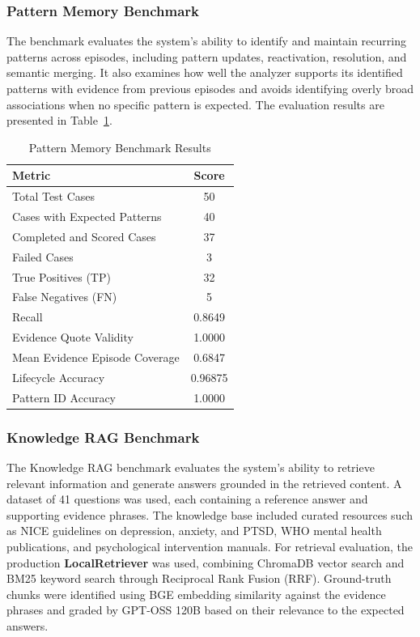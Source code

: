 \documentclass[conference]{IEEEtran}
\begin{document}
\subsubsection{Pattern Memory Benchmark}
The benchmark evaluates the system's ability to identify and maintain recurring patterns across episodes, including pattern updates, reactivation, resolution, and semantic merging. It also examines how well the analyzer supports its identified patterns with evidence from previous episodes and avoids identifying overly broad associations when no specific pattern is expected.
The evaluation results are presented in Table~\ref{tab:pattern_memory}.
\begin{table}[!ht]
\centering
\footnotesize
\renewcommand{\arraystretch}{1.4}
\setlength{\tabcolsep}{7pt}
\begin{tabular}{|l|c|}
\hline
\textbf{Metric} & \textbf{Score} \\ \hline
Total Test Cases & 50 \\ \hline
Cases with Expected Patterns & 40 \\ \hline
Completed and Scored Cases & 37 \\ \hline
Failed Cases & 3 \\ \hline
True Positives (TP) & 32 \\ \hline
False Negatives (FN) & 5 \\ \hline
Recall & 0.8649 \\ \hline
Evidence Quote Validity & 1.0000 \\ \hline
Mean Evidence Episode Coverage & 0.6847 \\ \hline
Lifecycle Accuracy & 0.96875 \\ \hline
Pattern ID Accuracy & 1.0000 \\ \hline
\end{tabular}
\renewcommand{\arraystretch}{1}
\setlength{\tabcolsep}{6pt}
\caption{Pattern Memory Benchmark Results}
\label{tab:pattern_memory}
\end{table}


\subsubsection{Knowledge RAG Benchmark}
The Knowledge RAG benchmark evaluates the system's ability to retrieve relevant information and generate answers grounded in the retrieved content. A dataset of 41 questions was used, each containing a reference answer and supporting evidence phrases. The knowledge base included curated resources such as NICE guidelines on depression, anxiety, and PTSD, WHO mental health publications, and psychological intervention manuals. For retrieval evaluation, the production \textbf{LocalRetriever} was used, combining ChromaDB vector search and BM25 keyword search through Reciprocal Rank Fusion (RRF). Ground-truth chunks were identified using BGE embedding similarity against the evidence phrases and graded by GPT-OSS 120B based on their relevance to the expected answers.
\end{document}
